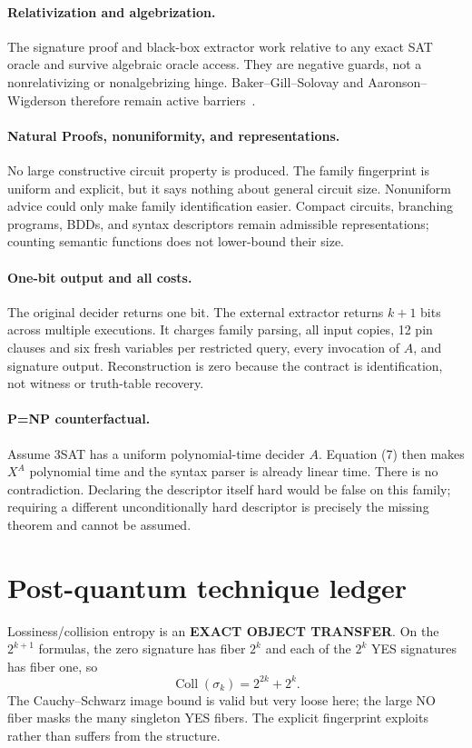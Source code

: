 \documentclass[11pt]{article}
\begin{document}
\paragraph{Relativization and algebrization.}
The signature proof and black-box extractor work relative to any exact SAT
oracle and survive algebraic oracle access.  They are negative guards, not a
nonrelativizing or nonalgebrizing hinge.  Baker--Gill--Solovay and
Aaronson--Wigderson therefore remain active barriers~\cite{BGS75,AW09}.

\paragraph{Natural Proofs, nonuniformity, and representations.}
No large constructive circuit property is produced.  The family fingerprint
is uniform and explicit, but it says nothing about general circuit size.
Nonuniform advice could only make family identification easier.  Compact
circuits, branching programs, BDDs, and syntax descriptors remain admissible
representations; counting semantic functions does not lower-bound their size.

\paragraph{One-bit output and all costs.}
The original decider returns one bit.  The external extractor returns
\(k+1\) bits across multiple executions.  It charges family parsing, all
input copies, 12 pin clauses and six fresh variables per restricted query,
every invocation of \(A\), and signature output.  Reconstruction is zero
because the contract is identification, not witness or truth-table recovery.

\paragraph{P=NP counterfactual.}
Assume 3SAT has a uniform polynomial-time decider \(A\).  Equation (7) then
makes \(X^A\) polynomial time and the syntax parser is already linear time.
There is no contradiction.  Declaring the descriptor itself hard would be
false on this family; requiring a different unconditionally hard descriptor
is precisely the missing theorem and cannot be assumed.

\section{Post-quantum technique ledger}
Lossiness/collision entropy is an \textbf{EXACT OBJECT TRANSFER}.  On the
\(2^{k+1}\) formulas, the zero signature has fiber \(2^k\) and each of the
\(2^k\) YES signatures has fiber one, so
\[
 \operatorname{Coll}(\sigma_k)=2^{2k}+2^k.                        \tag{11}
\]
The Cauchy--Schwarz image bound is valid but very loose here; the large NO
fiber masks the many singleton YES fibers.  The explicit fingerprint exploits
rather than suffers from the structure.
\end{document}

